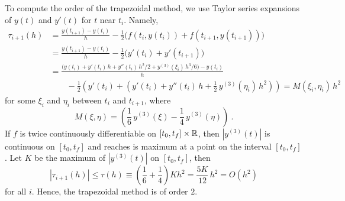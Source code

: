 To compute the order of the trapezoidal method, we use Taylor series
expansions of $y(t)$ and $y'(t)$ for $t$ near $t_i$.  Namely,
\begin{align*}
\tau_{i+1}(h) &= \frac{y(t_{i+1}) - y(t_i)}{h} - \frac{1}{2}\big(
f(t_i,y(t_i)) + f(t_{i+1},y(t_{i+1})) \big) \\
&= \frac{y(t_{i+1}) - y(t_i)}{h} -
\frac{1}{2} \big( y'(t_i) + y'(t_{i+1}) \big) \\
&= \frac{ \big(y(t_i) + y'(t_i)\,h + y''(t_i)\,h^2/2 +
y^{(3)}(\xi_i)\,h^3/6 \big) - y(t_i)}{h} \\
& \qquad -\frac{1}{2} \left( y'(t_i) +
\left(  y'(t_i) + y''(t_i)\,h + \frac{1}{2}\,y^{(3)}(\eta_i)\,h^2
\right) \right)
= M(\xi_i,\eta_i)\, h^2
\end{align*}
for some $\xi_i$ and $\eta_i$ between $t_i$ and $t_{i+1}$, where
\[
  M(\xi,\eta) = \left( \frac{1}{6}\,y^{(3)}(\xi)
-\frac{1}{4}\,y^{(3)}(\eta) \right) \ .
\]
If $f$ is twice continuously differentiable on $[t_0,t_f]\times\mathbb{R}$, then
$|y^{(3)}(t)|$ is continuous on $[t_0,t_f]$ and reaches is maximum at a point
on the interval $[t_0,t_f]$.  Let $K$ be the maximum of $|y^{(3)}(t)|$ on
$[t_0,t_f]$, then
\[
|\tau_{i+1}(h)| \leq \tau(h) \equiv
\left(\frac{1}{6}+\frac{1}{4} \right) K h^2
= \frac{5 K }{12}\, h^2  = O(h^2)
\]
for all $i$.  Hence, the trapezoidal method is of order $2$.

